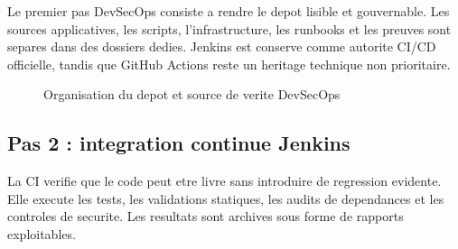 Le premier pas DevSecOps consiste a rendre le depot lisible et gouvernable. Les
sources applicatives, les scripts, l'infrastructure, les runbooks et les
preuves sont separes dans des dossiers dedies. Jenkins est conserve comme
autorite CI/CD officielle, tandis que GitHub Actions reste un heritage
technique non prioritaire.

\begin{figure}[htbp]
\centering
{}
\caption{Organisation du depot et source de verite DevSecOps}
\label{fig:devsecops-repo}
\end{figure}

\subsection{Pas 2 : integration continue Jenkins}

La CI verifie que le code peut etre livre sans introduire de regression
evidente. Elle execute les tests, les validations statiques, les audits de
dependances et les controles de securite. Les resultats sont archives sous
forme de rapports exploitables.

